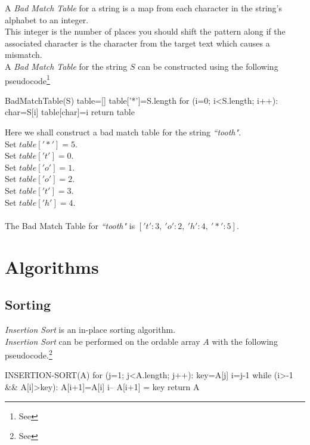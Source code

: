 \documentclass[11pt,a4paper]{article}
\begin{document}
A \textit{Bad Match Table} for a string is a map from each character in the string's alphabet to an integer.\\
This integer is the number of places you should shift the pattern along if the associated character is the character from the target text which causes a mismatch.\\

A \textit{Bad Match Table} for the string $S$ can be constructed using the following pseudocode\footnote{See }
\begin{code}
BadMatchTable(S)
table=[]
table['*']=S.length
for (i=0; i<S.length; i++):
  char=S[i]
  table[char]=i
return table
\end{code}

Here we shall construct a bad match table for the string \textit{``tooth"}.\\

Set $table['*']=5$.\\
Set $table['t']=0$.\\
Set $table['o']=1$.\\
Set $table['o']=2$.\\
Set $table['t']=3$.\\
Set $table['h']=4$.\\
\\
The Bad Match Table for \textit{``tooth"} is $['t':3,\ 'o':2,\ 'h':4,\ '*':5]$.

\newpage
\section{Algorithms}

\subsection{Sorting}

\textit{Insertion Sort} is an in-place sorting algorithm.\\
\textit{Insertion Sort} can be performed on the ordable array $A$ with the following pseudocode.\footnote{See }
\begin{code}
INSERTION-SORT(A)
for (j=1; j<A.length; j++):
  key=A[j]
  i=j-1
  while (i>-1 && A[i]>key):
    A[i+1]=A[i]
    i--
  A[i+1] = key
return A
\end{code}
\end{document}
